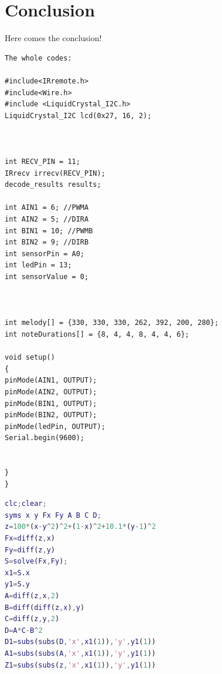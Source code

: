 \documentclass[12pt,a4paper]{report}
\begin{document}
\chapter{Conclusion}
Here comes the conclusion!

%
%





\begin{appendices}
\begin{verbatim}
The whole codes:

#include<IRremote.h>
#include<Wire.h>
#include <LiquidCrystal_I2C.h>
LiquidCrystal_I2C lcd(0x27, 16, 2);



int RECV_PIN = 11; 
IRrecv irrecv(RECV_PIN); 
decode_results results; 

int AIN1 = 6; //PWMA
int AIN2 = 5; //DIRA
int BIN1 = 10; //PWMB
int BIN2 = 9; //DIRB
int sensorPin = A0; 
int ledPin = 13; 
int sensorValue = 0; 



int melody[] = {330, 330, 330, 262, 392, 200, 280};
int noteDurations[] = {8, 4, 4, 8, 4, 4, 6};

void setup() 
{
pinMode(AIN1, OUTPUT);
pinMode(AIN2, OUTPUT);
pinMode(BIN1, OUTPUT);
pinMode(BIN2, OUTPUT);
pinMode(ledPin, OUTPUT);
Serial.begin(9600);


}
}
\end{verbatim}

\begin{lstlisting}[language={MATLAB}, keywordstyle=\color{blue!70},commentstyle=\color{green!40!black},frame=shadowbox, rulesepcolor=\color{red!20!green!20!blue!20},basicstyle=\footnotesize]
%Justification via Matlab of function 36%
clc;clear;
syms x y Fx Fy A B C D;
z=100*(x-y^2)^2+(1-x)^2+10.1*(y-1)^2
Fx=diff(z,x)
Fy=diff(z,y)
S=solve(Fx,Fy);
x1=S.x
y1=S.y
A=diff(z,x,2)
B=diff(diff(z,x),y)
C=diff(z,y,2)
D=A*C-B^2
D1=subs(subs(D,'x',x1(1)),'y',y1(1))
A1=subs(subs(A,'x',x1(1)),'y',y1(1))
Z1=subs(subs(z,'x',x1(1)),'y',y1(1))
\end{lstlisting}

\end{appendices}
\end{document}
